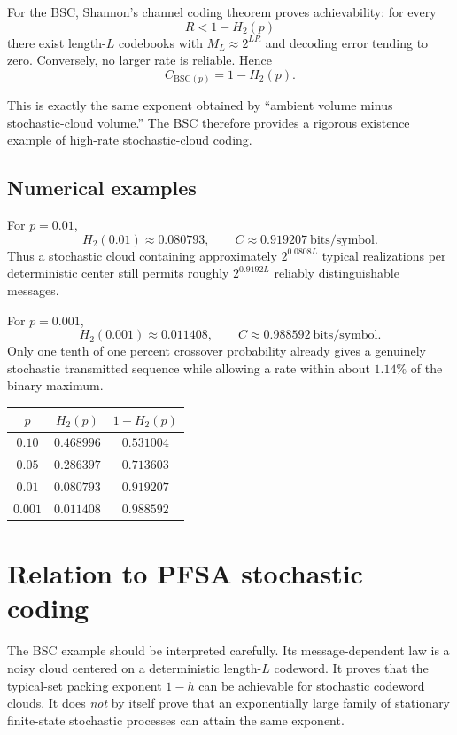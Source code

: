 \documentclass[11pt]{article}
\newcommand{\Hb}{H_2}
\begin{document}
For the BSC, Shannon's channel coding theorem proves achievability: for every
\[
R<1-\Hb(p)
\]
there exist length-$L$ codebooks with $M_L\approx2^{LR}$ and decoding error tending to zero.  Conversely, no larger rate is reliable.  Hence
\[
\boxed{C_{\mathrm{BSC}(p)}=1-\Hb(p).}
\]

This is exactly the same exponent obtained by ``ambient volume minus stochastic-cloud volume.''  The BSC therefore provides a rigorous existence example of high-rate stochastic-cloud coding.

\subsection{Numerical examples}
For $p=0.01$,
\[
\Hb(0.01)\approx0.080793,
\qquad
C\approx0.919207\ \text{bits/symbol}.
\]
Thus a stochastic cloud containing approximately $2^{0.0808L}$ typical realizations per deterministic center still permits roughly $2^{0.9192L}$ reliably distinguishable messages.

For $p=0.001$,
\[
\Hb(0.001)\approx0.011408,
\qquad
C\approx0.988592\ \text{bits/symbol}.
\]
Only one tenth of one percent crossover probability already gives a genuinely stochastic transmitted sequence while allowing a rate within about $1.14\%$ of the binary maximum.

\begin{center}
\begin{tabular}{@{}ccc@{}}
\toprule
$p$ & $H_2(p)$ & $1-H_2(p)$ \\
\midrule
$0.10$ & $0.468996$ & $0.531004$ \\
$0.05$ & $0.286397$ & $0.713603$ \\
$0.01$ & $0.080793$ & $0.919207$ \\
$0.001$ & $0.011408$ & $0.988592$ \\
\bottomrule
\end{tabular}
\end{center}

\section{Relation to PFSA stochastic coding}
The BSC example should be interpreted carefully.  Its message-dependent law is a noisy cloud centered on a deterministic length-$L$ codeword.  It proves that the typical-set packing exponent $1-h$ can be achievable for stochastic codeword clouds.  It does \emph{not} by itself prove that an exponentially large family of stationary finite-state stochastic processes can attain the same exponent.
\end{document}
